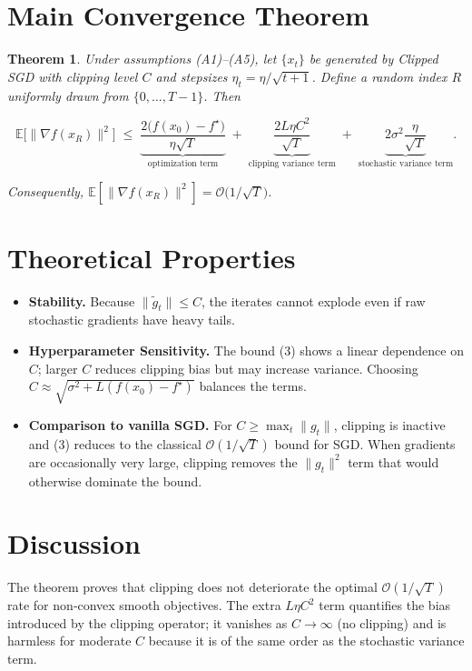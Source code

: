 \documentclass{article}
\newtheorem{theorem}{Theorem}
\newcommand{\E}{\mathbb{E}}
\begin{document}
\section*{Main Convergence Theorem}
\begin{theorem}
\label{thm:main}
Under assumptions (A1)–(A5), let $\{x_t\}$ be generated by Clipped SGD with clipping level $C$ and stepsizes $\eta_t=\eta/\sqrt{t+1}$. Define a random index $R$ uniformly drawn from $\{0,\dots,T-1\}$. Then

\[
\E\!\bigl[\|\nabla f(x_R)\|^{2}\bigr]
\;\le\;
\underbrace{\frac{2\bigl(f(x_0)-f^{\star}\bigr)}{\eta\sqrt{T}}}_{\text{optimization term}}
\;+\;
\underbrace{\frac{2L\eta C^{2}}{\sqrt{T}}}_{\text{clipping variance term}}
\;+\;
\underbrace{2\sigma^{2}\frac{\eta}{\sqrt{T}}}_{\text{stochastic variance term}}.
\tag{3}
\]

Consequently, $\E[\|\nabla f(x_R)\|^{2}]=\mathcal O\!\bigl(1/\sqrt{T}\bigr)$.
\end{theorem}

\section*{Theoretical Properties}
\begin{itemize}
\item \textbf{Stability.} Because $\|\tilde g_t\|\le C$, the iterates cannot explode even if raw stochastic gradients have heavy tails.
\item \textbf{Hyperparameter Sensitivity.} The bound (3) shows a linear dependence on $C$; larger $C$ reduces clipping bias but may increase variance. Choosing $C\approx\sqrt{\sigma^{2}+L(f(x_0)-f^{\star})}$ balances the terms.
\item \textbf{Comparison to vanilla SGD.} For $C\ge \max_t\|g_t\|$, clipping is inactive and (3) reduces to the classical $\mathcal O(1/\sqrt{T})$ bound for SGD. When gradients are occasionally very large, clipping removes the $ \|\!g_t\!\|^{2}$ term that would otherwise dominate the bound.
\end{itemize}

\section*{Discussion}
The theorem proves that clipping does not deteriorate the optimal $\mathcal O(1/\sqrt{T})$ rate for non‑convex smooth objectives. The extra $L\eta C^{2}$ term quantifies the bias introduced by the clipping operator; it vanishes as $C\to\infty$ (no clipping) and is harmless for moderate $C$ because it is of the same order as the stochastic variance term.
\end{document}
